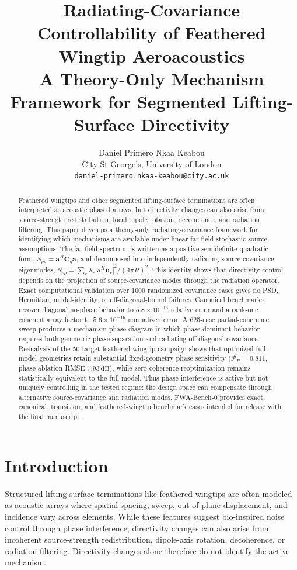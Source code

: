 \documentclass[11pt]{article}
\title{
    \textbf{Radiating-Covariance Controllability of Feathered Wingtip Aeroacoustics}\\
    \large A Theory-Only Mechanism Framework for Segmented Lifting-Surface Directivity
}
\author{
    Daniel Primero Nkaa Keabou\\
    City St George's, University of London\\
    \texttt{daniel-primero.nkaa-keabou@city.ac.uk}
}
\date{}
\newcommand{\vect}[1]{\bm{#1}}
\newcommand{\mat}[1]{\bm{#1}}
\begin{document}
\maketitle

\begin{abstract}
Feathered wingtips and other segmented lifting-surface terminations are often interpreted as acoustic phased arrays, but directivity changes can also arise from source-strength redistribution, local dipole rotation, decoherence, and radiation filtering. This paper develops a theory-only radiating-covariance framework for identifying which mechanisms are available under linear far-field stochastic-source assumptions. The far-field spectrum is written as a positive-semidefinite quadratic form, $S_{pp}=\vect{a}^{H}\mat{C}_q\vect{a}$, and decomposed into independently radiating source-covariance eigenmodes, $S_{pp}=\sum_r \lambda_r|\vect{a}^{H}\vect{u}_r|^2/(4\pi R)^2$. This identity shows that directivity control depends on the projection of source-covariance modes through the radiation operator. Exact computational validation over 1000 randomized covariance cases gives no PSD, Hermitian, modal-identity, or off-diagonal-bound failures. Canonical benchmarks recover diagonal no-phase behavior to $5.8\times10^{-16}$ relative error and a rank-one coherent array factor to $5.6\times10^{-16}$ normalized error. A 625-case partial-coherence sweep produces a mechanism phase diagram in which phase-dominant behavior requires both geometric phase separation and radiating off-diagonal covariance. Reanalysis of the 50-target feathered-wingtip campaign shows that optimized full-model geometries retain substantial fixed-geometry phase sensitivity ($\overline{\mathcal P_R}=0.811$, phase-ablation RMSE $7.93\,\mathrm{dB}$), while zero-coherence reoptimization remains statistically equivalent to the full model. Thus phase interference is active but not uniquely controlling in the tested regime: the design space can compensate through alternative source-covariance and radiation modes. FWA-Bench-0 provides exact, canonical, transition, and feathered-wingtip benchmark cases intended for release with the final manuscript.
\end{abstract}

\section{Introduction}

Structured lifting-surface terminations like feathered wingtips are often modeled as acoustic arrays where spatial spacing, sweep, out-of-plane displacement, and incidence vary across elements. While these features suggest bio-inspired noise control through phase interference, directivity changes can also arise from incoherent source-strength redistribution, dipole-axis rotation, decoherence, or radiation filtering. Directivity changes alone therefore do not identify the active mechanism.
\end{document}
